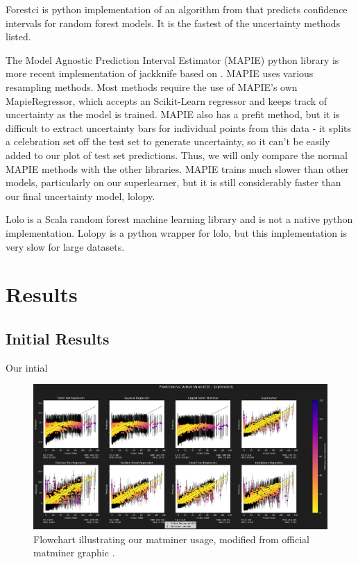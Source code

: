 \documentclass[twocolumn, nofootinbib, secnumarabic, amssymb, nobibnotes, aps, prd]{revtex4-2}
\begin{document}
Forestci is python implementation of an algorithm from \cite{Wager2014} that predicts confidence intervals for random forest models. It is the fastest of the uncertainty methods listed. 

The Model Agnostic Prediction Interval Estimator (MAPIE) python library is more recent implementation of jackknife based on \cite{Foygel2020}. MAPIE uses various resampling methods. Most methods require the use of MAPIE's own MapieRegressor, which accepts an Scikit-Learn regressor and keeps track of uncertainty as the model is trained. MAPIE also has a prefit method, but it is difficult to extract uncertainty bars for individual points from this data - it splits a celebration set off the test set to generate uncertainty, so it can't be easily added to our plot of test set predictions. Thus, we will only compare the normal MAPIE methods with the other libraries. MAPIE trains much slower than other models, particularly on our superlearner, but it is still considerably faster than our final uncertainty model, lolopy.

Lolo is a Scala random forest machine learning library and is not a native python implementation. Lolopy is a python wrapper for lolo, but this implementation is very slow for large datasets. 

\section{Results}

\subsection{Initial Results}
Our intial

\onecolumngrid
\begin{figure}[!htb]
   \centering
   \includegraphics[scale=0.38]{../data/results_optimized.png}
   \caption{Flowchart illustrating our matminer usage, modified from official matminer graphic \cite{WARD201860}.}
   \label{fig:results}
\end{figure}
\twocolumngrid



\end{document}
